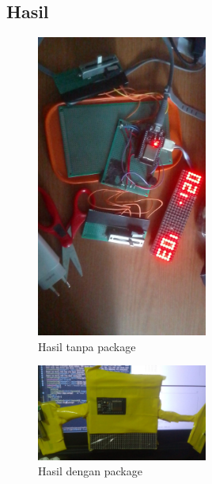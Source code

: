 \documentclass[a4paper,12pt]{article}
\begin{document}
\subsection{Hasil}
\begin{figure}[h!]
    \centering
    \includegraphics[width=0.5\textwidth]{./images/no-package.jpeg}
    \caption{Hasil tanpa package}
\end{figure}
\begin{figure}[h!]
    \centering
    \includegraphics[width=0.5\textwidth]{./images/with_package.jpeg}
    \caption{Hasil dengan package}
\end{figure}
\end{document}
